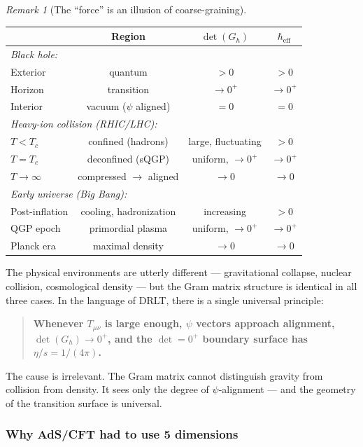 \documentclass[12pt]{article}
\theoremstyle{remark}
\newtheorem{remark}[theorem]{Remark}
\theoremstyle{definition}
\begin{document}
\begin{remark}[The ``force'' is an illusion of coarse-graining]
\begin{center}
\begin{tabular}{lccc}
\hline
& Region & $\det(G_h)$ & $\hbar_\text{eff}$ \\
\hline
\multicolumn{4}{l}{\emph{Black hole:}} \\
\quad Exterior & quantum & $> 0$ & $> 0$ \\
\quad Horizon & transition & $\to 0^+$ & $\to 0^+$ \\
\quad Interior & vacuum ($\psi$ aligned) & $= 0$ & $= 0$ \\
\hline
\multicolumn{4}{l}{\emph{Heavy-ion collision (RHIC/LHC):}} \\
\quad $T < T_c$ & confined (hadrons) & large, fluctuating & $> 0$ \\
\quad $T = T_c$ & deconfined (sQGP) & uniform, $\to 0^+$ & $\to 0^+$ \\
\quad $T \to \infty$ & compressed $\to$ aligned & $\to 0$ & $\to 0$ \\
\hline
\multicolumn{4}{l}{\emph{Early universe (Big Bang):}} \\
\quad Post-inflation & cooling, hadronization & increasing & $> 0$ \\
\quad QGP epoch & primordial plasma & uniform, $\to 0^+$ & $\to 0^+$ \\
\quad Planck era & maximal density & $\to 0$ & $\to 0$ \\
\hline
\end{tabular}
\end{center}

The physical environments are utterly different --- gravitational collapse, nuclear collision, cosmological density --- but the Gram matrix structure is identical in all three cases. In the language of DRLT, there is a single universal principle:

\begin{quote}
\textbf{Whenever $T_{\mu\nu}$ is large enough, $\psi$ vectors approach alignment, $\det(G_h) \to 0^+$, and the $\det = 0^+$ boundary surface has $\eta/s = 1/(4\pi)$.}
\end{quote}

The cause is irrelevant. The Gram matrix cannot distinguish gravity from collision from density. It sees only the degree of $\psi$-alignment --- and the geometry of the transition surface is universal.

\subsubsection{Why AdS/CFT had to use 5 dimensions}


\end{remark}
\end{document}
